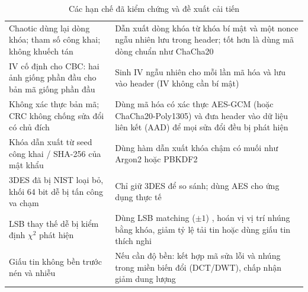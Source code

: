 \begin{table}[H]
\centering
\caption{Các hạn chế đã kiểm chứng và đề xuất cải tiến}
\label{tab:improve}
\small
\begin{tabularx}{\linewidth}{@{}P{4.5cm}L@{}}
\toprule
{} & \\
\midrule
Chaotic dùng lại dòng khóa; tham số công khai; không khuếch tán
  & Dẫn xuất dòng khóa từ khóa bí mật và một nonce ngẫu nhiên lưu trong header; tốt hơn là dùng mã dòng chuẩn như ChaCha20\\
IV cố định cho CBC: hai ảnh giống phần đầu cho bản mã giống phần đầu
  & Sinh IV ngẫu nhiên cho mỗi lần mã hóa và lưu vào header (IV không cần bí mật)\\
Không xác thực bản mã; CRC không chống sửa đổi có chủ đích
  & Dùng mã hóa có xác thực AES-GCM \cite{sp80038d} (hoặc ChaCha20-Poly1305) và đưa header vào dữ liệu liên kết (AAD) để mọi sửa đổi đều bị phát hiện\\
Khóa dẫn xuất từ seed công khai / SHA-256 của mật khẩu
  & Dùng hàm dẫn xuất khóa chậm có muối như Argon2 \cite{rfc9106} hoặc PBKDF2\\
3DES đã bị NIST loại bỏ, khối 64 bit dễ bị tấn công va chạm
  & Chỉ giữ 3DES để so sánh; dùng AES cho ứng dụng thực tế\\
LSB thay thế dễ bị kiểm định $\chi^2$ phát hiện
  & Dùng LSB matching ($\pm1$) \cite{mielikainen2006}, hoán vị vị trí nhúng bằng khóa, giảm tỷ lệ tải tin hoặc dùng giấu tin thích nghi \cite{holub2014}\\
Giấu tin không bền trước nén và nhiễu
  & Nếu cần độ bền: kết hợp mã sửa lỗi và nhúng trong miền biến đổi (DCT/DWT), chấp nhận giảm dung lượng\\
\bottomrule
\end{tabularx}
\end{table}

